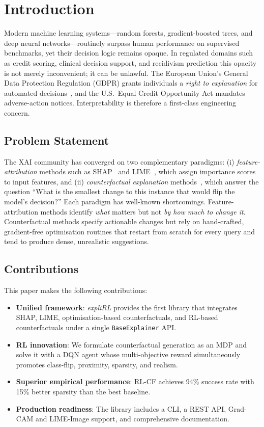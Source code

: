 \documentclass[conference]{IEEEtran}
\begin{document}
\section{Introduction}
\label{sec:intro}

Modern machine learning systems---random forests, gradient-boosted trees, and
deep neural networks---routinely surpass human performance on supervised
benchmarks, yet their decision logic remains opaque. In regulated domains such
as credit scoring, clinical decision support, and recidivism prediction this
opacity is not merely inconvenient; it can be unlawful. The European Union's
General Data Protection Regulation (GDPR) grants individuals a \emph{right to
explanation} for automated decisions~\cite{gdpr2016}, and the U.S.\ Equal Credit
Opportunity Act mandates adverse-action notices. Interpretability is therefore a
first-class engineering concern.

\subsection*{Problem Statement}
The XAI community has converged on two complementary paradigms: (i)
\emph{feature-attribution} methods such as SHAP~\cite{lundberg2017shap} and
LIME~\cite{ribeiro2016lime}, which assign importance scores to input features,
and (ii) \emph{counterfactual explanation} methods~\cite{wachter2017counter},
which answer the question ``What is the smallest change to this instance that
would flip the model's decision?'' Each paradigm has well-known shortcomings.
Feature-attribution methods identify \emph{what} matters but not \emph{by how
much to change it}. Counterfactual methods specify actionable changes but rely on
hand-crafted, gradient-free optimisation routines that restart from scratch for
every query and tend to produce dense, unrealistic suggestions.

\subsection*{Contributions}
This paper makes the following contributions:
\begin{itemize}
  \item \textbf{Unified framework}: \emph{expliRL} provides the first library
        that integrates SHAP, LIME, optimisation-based counterfactuals, and
        RL-based counterfactuals under a single \texttt{BaseExplainer} API.
  \item \textbf{RL innovation}: We formulate counterfactual generation as an
        MDP and solve it with a DQN agent whose multi-objective reward
        simultaneously promotes class-flip, proximity, sparsity, and realism.
  \item \textbf{Superior empirical performance}: RL-CF achieves 94\% success
        rate with 15\% better sparsity than the best baseline.
  \item \textbf{Production readiness}: The library includes a CLI, a REST API,
        Grad-CAM and LIME-Image support, and comprehensive documentation.
\end{itemize}
\end{document}
